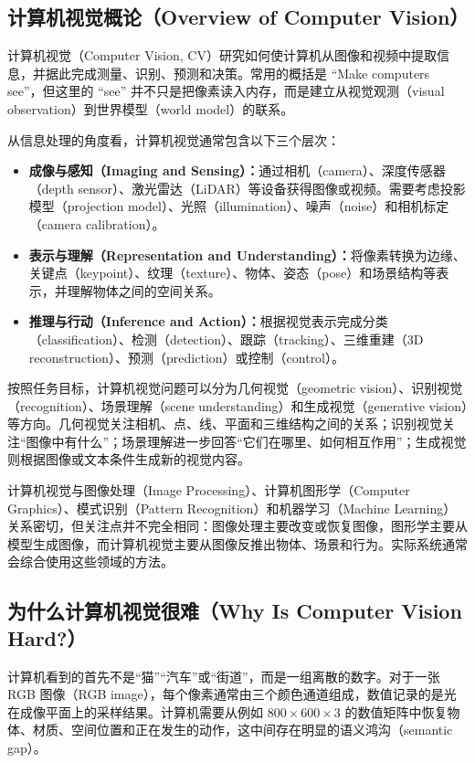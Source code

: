 \documentclass{ctexart}
\begin{document}
\subsection{计算机视觉概论（Overview of Computer Vision）}

计算机视觉（Computer Vision, CV）研究如何使计算机从图像和视频中提取信息，并据此完成测量、识别、预测和决策。常用的概括是 ``Make computers see''，但这里的 ``see'' 并不只是把像素读入内存，而是建立从视觉观测（visual observation）到世界模型（world model）的联系。

从信息处理的角度看，计算机视觉通常包含以下三个层次：

\begin{itemize}
    \item \textbf{成像与感知（Imaging and Sensing）：}通过相机（camera）、深度传感器（depth sensor）、激光雷达（LiDAR）等设备获得图像或视频。需要考虑投影模型（projection model）、光照（illumination）、噪声（noise）和相机标定（camera calibration）。
    \item \textbf{表示与理解（Representation and Understanding）：}将像素转换为边缘、关键点（keypoint）、纹理（texture）、物体、姿态（pose）和场景结构等表示，并理解物体之间的空间关系。
    \item \textbf{推理与行动（Inference and Action）：}根据视觉表示完成分类（classification）、检测（detection）、跟踪（tracking）、三维重建（3D reconstruction）、预测（prediction）或控制（control）。
\end{itemize}

按照任务目标，计算机视觉问题可以分为几何视觉（geometric vision）、识别视觉（recognition）、场景理解（scene understanding）和生成视觉（generative vision）等方向。几何视觉关注相机、点、线、平面和三维结构之间的关系；识别视觉关注“图像中有什么”；场景理解进一步回答“它们在哪里、如何相互作用”；生成视觉则根据图像或文本条件生成新的视觉内容。

计算机视觉与图像处理（Image Processing）、计算机图形学（Computer Graphics）、模式识别（Pattern Recognition）和机器学习（Machine Learning）关系密切，但关注点并不完全相同：图像处理主要改变或恢复图像，图形学主要从模型生成图像，而计算机视觉主要从图像反推出物体、场景和行为。实际系统通常会综合使用这些领域的方法。

\subsection{为什么计算机视觉很难（Why Is Computer Vision Hard?）}

计算机看到的首先不是“猫”“汽车”或“街道”，而是一组离散的数字。对于一张 RGB 图像（RGB image），每个像素通常由三个颜色通道组成，数值记录的是光在成像平面上的采样结果。计算机需要从例如 $800\times600\times3$ 的数值矩阵中恢复物体、材质、空间位置和正在发生的动作，这中间存在明显的语义鸿沟（semantic gap）。
\end{document}

